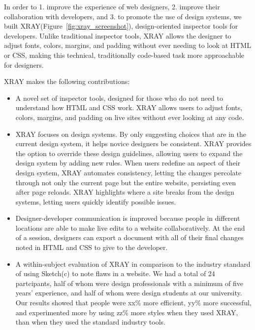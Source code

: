 \documentclass{sigchi}
\newcommand{\xray}{XRAY\xspace}
\begin{document}
In order to 1. improve the experience of web designers, 2. improve their collaboration with developers, and 3. to promote the use of design systems, we built \xray (Figure~\ref{fig:xray_screenshot}), design-oriented inspector tools for developers. Unlike traditional inspector tools, \xray allows the designer to adjust fonts, colors, margins, and padding without ever needing to look at HTML or CSS, making this technical, traditionally code-based task more approachable for designers. 


\xray makes the following contributions: 

\begin{itemize}
    \item A novel set of inspector tools, designed for those who do not need to understand how HTML and CSS work. \xray allows users to adjust fonts, colors, margins, and padding on live sites without ever looking at any code. 
    
    \item \xray focuses on design systems. By only suggesting choices that are in the current design system, it helps novice designers be consistent. \xray provides the option to override these design guidelines, allowing users to expand the design system by adding new rules. When users redefine an aspect of their design system, \xray automates consistency, letting the changes percolate through not only the current page but the entire website, persisting even after page reloads. \xray highlights where a site breaks from the design systems, letting users quickly identify possible issues. 
    
    \item Designer-developer communication is improved because people in different locations are able to make live edits to a website collaboratively. At the end of a session, designers can export a document with all of their final changes noted in HTML and CSS to give to the developer.  
    
    \item A within-subject evaluation of \xray in comparison to the industry standard of using Sketch(c) to note flaws in a website. We had a total of 24 partcipants, half of whom were design professionals with a minimum of five years' experience, and half of whom were design students at our university. Our results showed that people were xx\% more efficient, yy\% more successful, and experimented more by using zz\% more styles when they used \xray, than when they used the standard industry tools.
\end{itemize}
\end{document}
